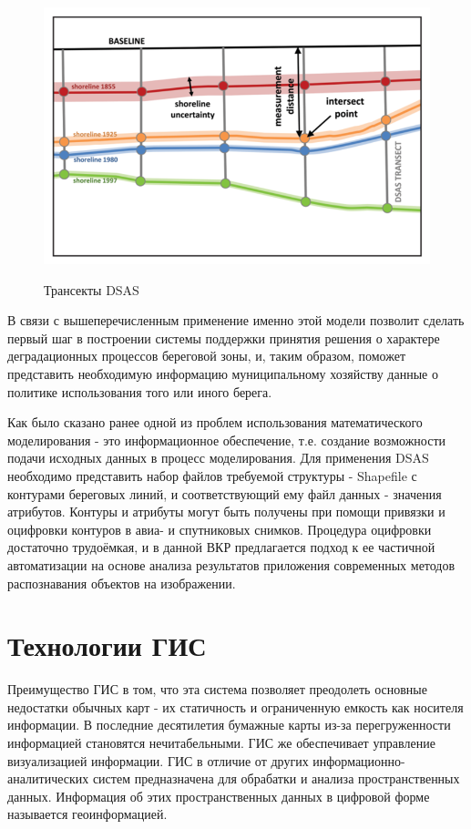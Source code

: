 \documentclass[732,fontsize=14pt,final]{studrep}
\begin{document}
\begin{figure}[htp]
  \centering
  \includegraphics[width=\linewidth]{pics/image9.png}\label{fig:dsas-trans}
  \caption{Трансекты DSAS}
\end{figure}

В связи с вышеперечисленным применение именно этой модели позволит сделать первый шаг в построении системы поддержки принятия решения о характере деградационных процессов береговой зоны, и, таким образом, поможет представить необходимую информацию муниципальному хозяйству данные о политике использования того или иного берега.

Как было сказано ранее одной из проблем использования математического моделирования - это информационное обеспечение, т.е. создание возможности подачи исходных данных в процесс моделирования. Для применения DSAS необходимо представить набор файлов требуемой структуры - Shapefile с контурами береговых линий, и соответствующий ему файл данных - значения атрибутов. Контуры и атрибуты могут быть получены при помощи привязки и оцифровки контуров в авиа- и спутниковых снимков. Процедура оцифровки достаточно трудоёмкая, и в данной ВКР предлагается подход к ее частичной автоматизации на основе анализа результатов приложения современных методов распознавания объектов на изображении.

\section{Технологии ГИС}

Преимущество ГИС в том, что эта система позволяет преодолеть основные недостатки обычных карт - их статичность и ограниченную емкость как носителя информации. В последние десятилетия бумажные карты из-за перегруженности информацией становятся нечитабельными. ГИС же обеспечивает управление визуализацией информации. ГИС в отличие от других информационно-аналитических систем предназначена для обрабатки и анализа пространственных данных. Информация об этих пространственных данных в цифровой форме называется геоинформацией.
\end{document}
